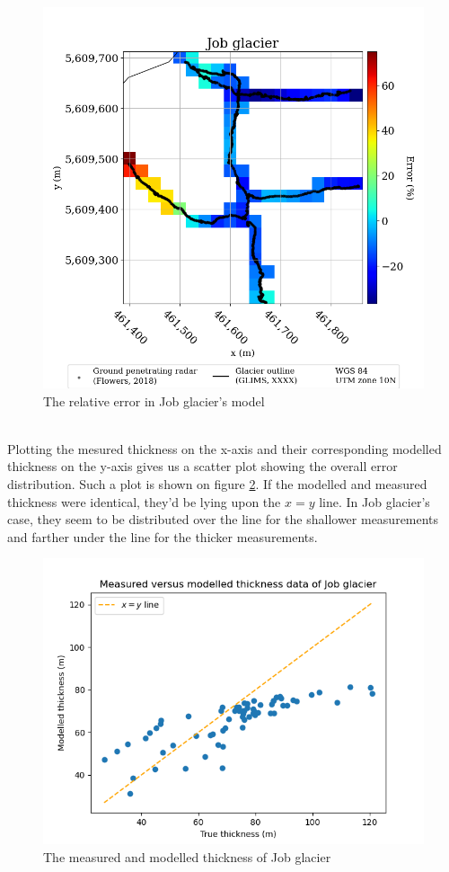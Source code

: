 \documentclass[a4, 12pt]{article}
\begin{document}
\begin{figure}[h!]
\centering
\includegraphics[scale=0.4]{../job_kluane_maps/Job glacier_rel_error.png}
\caption{The relative error in Job glacier's model}
\label{fig:rel_error_job_thickness}
\end{figure}
\\
Plotting the mesured thickness on the x-axis and their corresponding modelled thickness on the y-axis gives us a scatter plot showing the overall error distribution. Such a plot is shown on figure \ref{fig:xy_job_thickness}. If the modelled and measured thickness were identical, they'd be lying upon the $x=y$ line. In Job glacier's case, they seem to be distributed over the line for the shallower measurements and farther under the line for the thicker measurements. 
\begin{figure}[h!]
\centering
\includegraphics[scale=0.5]{../job_kluane_maps/Job glacier_xy.png}
\caption{The measured and modelled thickness of Job glacier}
\label{fig:xy_job_thickness}
\end{figure}
\end{document}
